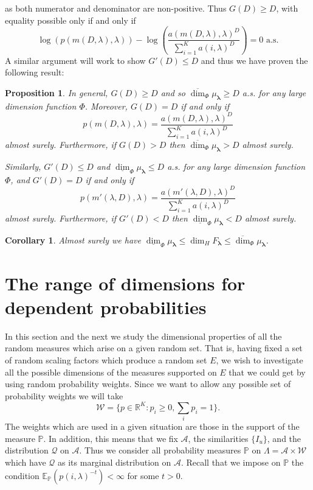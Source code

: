 \documentclass{amsart}
\newtheorem{corollary}[theorem]{Corollary}
\newtheorem{proposition}[theorem]{Proposition}
\theoremstyle{plain}
\numberwithin{equation}{section}
\newcommand{\R}{{\mathbb R}}
\renewcommand{\P}{{\mathbb P}}
\newcommand{\cQ}{{\mathcal Q}}
\newcommand{\cA}{{\mathcal A}}
\newcommand{\cW}{{\mathcal W}}
\newcommand{\blambda}{{\boldsymbol{\lambda}}}
\newcommand{\ee}{{\mathbb E}}
\newcommand{\odim}{\overline{\dim}}
\newcommand{\udim}{\underline{\dim}}
\begin{document}
as both numerator and denominator are non-positive. 
Thus $G(D)\geq D$, with equality possible only if and only if 
\begin{equation*}
        \log (p(m(D,\lambda),\lambda))-
        \log \left( \frac{a(m(D,\lambda),\lambda)^{D}}{\sum_{i=1}^Ka(i,\lambda)^{D}}\right) =0\text{ a.s.}
\end{equation*}
A similar argument will work to show $G'(D) \le D$ and thus we have proven the following result:

\begin{proposition}
\label{prop:general_gap} 
In general, $G(D)\geq D$ and so $\odim_\Phi \mu_\blambda \ge D$ a.s. for any large dimension function $\Phi$. 
Moreover, $G(D)=D$ if and only if 
\begin{equation*}
    p(m(D,\lambda),\lambda)=\frac{a(m(D,\lambda),\lambda)^{D}}{\sum_{i=1}^{K}a(i,\lambda)^{D}}
\end{equation*}
almost surely. 
Furthermore, if $G(D)>D$ then $\odim_{\Phi}\mu_{\blambda}>D$ almost surely.

Similarly, $G'(D) \le D$ and $\udim_\Phi \mu_\blambda \le D$ a.s. for any large dimension function $\Phi$, and $G'(D) = D$ if and only if
\begin{equation*}
    p(m'(\lambda,D),\lambda)=
    \frac{a(m'(\lambda,D),\lambda)^{D}}{\sum_{i=1}^{K}a(i,\lambda)^{D}}
\end{equation*}
almost surely. 
Furthermore, if $G'(D)< D$ then $\udim_{\Phi}\mu_{\blambda}< D$ almost surely.

\end{proposition}

\begin{corollary} \label{cor:D_bound}
Almost surely we have $\udim_\Phi \mu_\blambda \le \dim_H F_\blambda \le \odim_\Phi \mu_\blambda$.
\end{corollary}



\section{The range of dimensions for dependent probabilities}
\label{sec:range}

In this section and the next we study the dimensional properties of all the random
measures which arise on a given random set. 
That is, having fixed a set of random scaling factors which produce a random set $E$, we wish to investigate all the 
possible dimensions of the measures supported on $E$ that we could get by using random probability weights.
Since we want to allow any possible set of probability weights we will take
\[
    \cW = \{ p \in \R^K : p_i \ge 0, \sum_i p_i = 1 \}.
\]
The weights which are used in a given situation are those in the support of the measure $\P$.
In addition, this means that we fix  $\cA$, the similarities $\{I_{u}\}$, and the distribution $\cQ$ on $\cA$.
Thus we consider all probability measures $\P$ on $\Lambda = \cA \times \cW$ which have $\cQ$ as its marginal distribution on $\cA$.
Recall that we impose on $\P$ the condition $\ee_\P(p(i,\lambda)^{-t}) < \infty$ for some $t > 0$.
\end{document}
